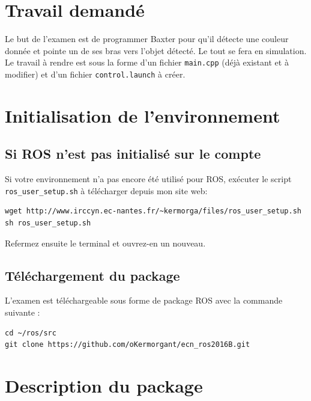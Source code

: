 \documentclass{ecnreport}
\begin{document}


\section{Travail demandé}

Le but de l'examen est de programmer Baxter pour qu'il détecte une couleur donnée et pointe un de ses bras vers l'objet détecté. Le tout se fera en simulation.
Le travail à rendre est sous la forme d'un fichier \texttt{main.cpp} (déjà existant et à modifier) et d'un fichier \texttt{control.launch} à créer.

\section{Initialisation de l'environnement}
  
\subsection{Si ROS n'est pas initialisé sur le compte}

Si votre environnement n'a pas encore été utilisé pour ROS, exécuter le script \texttt{ros\_user\_setup.sh} à télécharger depuis mon site web:
\begin{lstlisting}
wget http://www.irccyn.ec-nantes.fr/~kermorga/files/ros_user_setup.sh
sh ros_user_setup.sh
\end{lstlisting}
Refermez ensuite le terminal et ouvrez-en un nouveau.

\subsection{Téléchargement du package}

L'examen est téléchargeable sous forme de package ROS avec la commande suivante : 
\begin{center}
\begin{lstlisting}
cd ~/ros/src
git clone https://github.com/oKermorgant/ecn_ros2016B.git
\end{lstlisting}
\end{center}



\section{Description du package}
\end{document}
